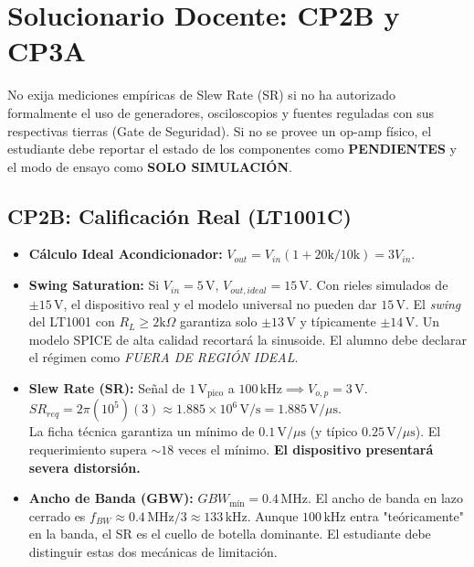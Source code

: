 \documentclass[11pt, a4paper]{article}
\begin{document}
\section*{Solucionario Docente: CP2B y CP3A}

\begin{tcolorbox}[colback=ucbblue!5, colframe=ucbblue, title=\textbf{Alerta Pedagógica para Autorización de Hardware}]
    No exija mediciones empíricas de Slew Rate (SR) si no ha autorizado formalmente el uso de generadores, osciloscopios y fuentes reguladas con sus respectivas tierras (Gate de Seguridad). Si no se provee un op-amp físico, el estudiante debe reportar el estado de los componentes como \textbf{PENDIENTES} y el modo de ensayo como \textbf{SOLO SIMULACIÓN}.
\end{tcolorbox}

\subsection*{CP2B: Calificación Real (LT1001C)}
\begin{itemize}
    \item \textbf{Cálculo Ideal Acondicionador:} $V_{out} = V_{in}(1 + 20\text{k}/10\text{k}) = 3 V_{in}$.
    \item \textbf{Swing Saturation:} Si $V_{in} = 5\,\text{V}$, $V_{out, ideal} = 15\,\text{V}$. Con rieles simulados de $\pm15\,\text{V}$, el dispositivo real y el modelo universal no pueden dar $15\,\text{V}$. El \textit{swing} del LT1001 con $R_L \ge 2\text{k}\Omega$ garantiza solo $\pm13\,\text{V}$ y típicamente $\pm14\,\text{V}$. Un modelo SPICE de alta calidad recortará la sinusoide. El alumno debe declarar el régimen como \textit{FUERA DE REGIÓN IDEAL}.
    \item \textbf{Slew Rate (SR):} Señal de $1\,\text{V}_\text{pico}$ a $100\,\text{kHz} \implies V_{o,p} = 3\,\text{V}$. \\
    $SR_{req} = 2\pi (10^5) (3) \approx 1.885 \times 10^6\,\text{V/s} = 1.885\,\text{V/}\mu\text{s}$. \\
    La ficha técnica garantiza un mínimo de $0.1\,\text{V/}\mu\text{s}$ (y típico $0.25\,\text{V/}\mu\text{s}$). El requerimiento supera $\sim18$ veces el mínimo. \textbf{El dispositivo presentará severa distorsión.}
    \item \textbf{Ancho de Banda (GBW):} $GBW_{\text{mín}} = 0.4\,\text{MHz}$. El ancho de banda en lazo cerrado es $f_{BW} \approx 0.4\,\text{MHz} / 3 \approx 133\,\text{kHz}$. Aunque $100\,\text{kHz}$ entra "teóricamente" en la banda, el SR es el cuello de botella dominante. El estudiante debe distinguir estas dos mecánicas de limitación.
\end{itemize}
\end{document}
